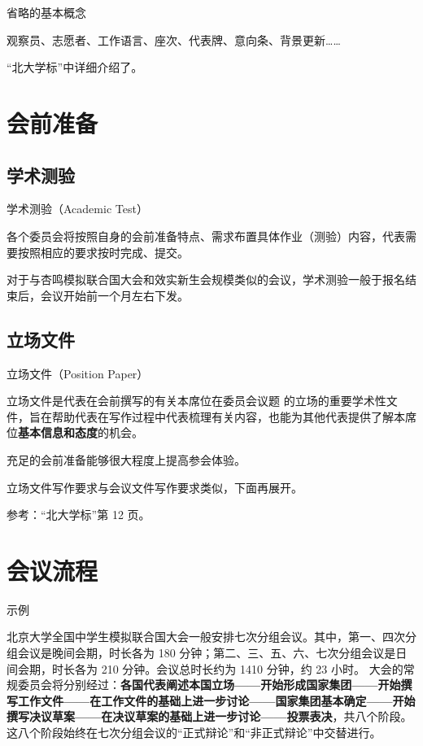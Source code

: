 \documentclass{beamer}
\begin{document}
\begin{frame}{省略的基本概念}

观察员、志愿者、工作语言、座次、代表牌、意向条、背景更新……

“北大学标”中详细介绍了。

\end{frame}


\section{会前准备}

\subsection{学术测验}

\begin{frame}{学术测验（Academic Test）}

各个委员会将按照自身的会前准备特点、需求布置具体作业（测验）内容，代表需要按照相应的要求按时完成、提交。

对于与杏鸣模拟联合国大会和效实新生会规模类似的会议，学术测验一般于报名结束后，会议开始前一个月左右下发。
    
\end{frame}

\subsection{立场文件}

\begin{frame}{立场文件（Position Paper）}

立场文件是代表在会前撰写的有关本席位在委员会议题 的立场的重要学术性文件，旨在帮助代表在写作过程中代表梳理有关内容，也能为其他代表提供了解本席位\textbf{基本信息和态度}的机会。

充足的会前准备能够很大程度上提高参会体验。

立场文件写作要求与会议文件写作要求类似，下面再展开。

参考：“北大学标”第 12 页。

\end{frame}

\section{会议流程}

\begin{frame}{示例}

北京大学全国中学生模拟联合国大会一般安排七次分组会议。其中，第一、四次分组会议是晚间会期，时长各为 180 分钟；第二、三、五、六、七次分组会议是日间会期，时长各为 210 分钟。会议总时长约为 1410 分钟，约 23 小时。
大会的常规委员会将分别经过：\textbf{各国代表阐述本国立场——开始形成国家集团——开始撰写工作文件——在工作文件的基础上进一步讨论——国家集团基本确定——开始撰写决议草案——在决议草案的基础上进一步讨论——投票表决}，共八个阶段。这八个阶段始终在七次分组会议的“正式辩论”和“非正式辩论”中交替进行。

\end{frame}
\end{document}
